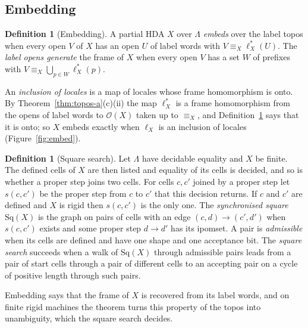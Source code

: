\documentclass{lmcs}
\theoremstyle{definition}
\newtheorem{definition}[theorem]{Definition}
\theoremstyle{remark}
\newcommand{\Op}{\mathcal{O}}
\newcommand{\feq}[1]{\equiv_{#1}}
\providecommand{\Sq}[1]{\mathrm{Sq}(#1)}
\providecommand{\lst}[1]{\ell^{*}_{#1}}
\begin{document}
\subsection{Embedding}\label{ssec:image-trivial}

\begin{definition}[Embedding]\label{def:embed}\label{def:image-is}\label{def:generate}
A partial HDA $X$ over $\Lambda$ \emph{embeds} over the label topos when every open $V$ of $X$ has an open $U$ of label
words with $V\feq{X}\lst{X}(U)$. The \emph{label opens generate} the frame of $X$ when every
open $V$ has a set $W$ of prefixes with $V\feq{X}\bigcup_{p\in W}\lst{X}(p)$.
\end{definition}

An \emph{inclusion of locales} is a map of locales whose frame homomorphism is onto. By
Theorem~\ref{thm:topos-a}(c)(ii) the map $\lst{X}$ is a frame homomorphism from the opens of label words to $\Op(X)$
taken up to $\feq{X}$, and Definition~\ref{def:embed} says that it is onto; so $X$ embeds exactly when $\ell_X$ is an
inclusion of locales (Figure~\ref{fig:embed}).

\begin{definition}[Square search]\label{def:square}
Let $\Lambda$ have decidable equality and $X$ be finite. The defined cells of $X$ are then
listed and equality of its cells is decided, and so is whether a proper step
joins two cells.
For cells $c,c'$ joined by a proper step let $s(c,c')$ be the proper step from $c$ to $c'$ that this
decision returns. If $c$ and $c'$ are defined and $X$ is rigid then $s(c,c')$ is the only
one. The \emph{synchronised square} $\Sq{X}$ is the graph on
pairs of cells with an edge $(c,d)\to(c',d')$ when $s(c,c')$ exists and some proper step $d\to d'$ has its
ipomset. A pair is \emph{admissible} when its cells are defined and have one shape and
one acceptance bit. The \emph{square search} succeeds when a walk of $\Sq{X}$ through
admissible pairs leads from a pair of start cells through a pair of different cells to an accepting pair
on a cycle of positive length through such pairs.
\end{definition}

Embedding says that the frame of $X$ is recovered from its label words, and on finite rigid machines the theorem
turns this property of the topos into unambiguity, which the square search decides.
\end{document}
